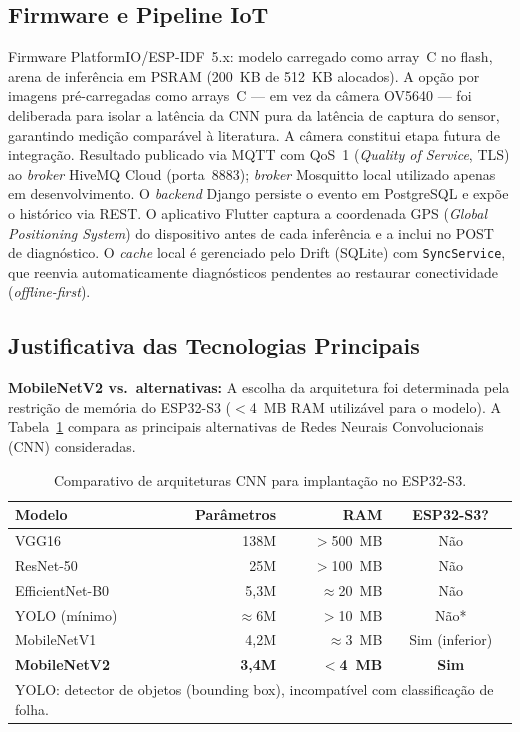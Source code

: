 \documentclass[12pt]{article}
\begin{document}
\subsection{Firmware e Pipeline IoT}

Firmware PlatformIO/ESP-IDF~5.x: modelo carregado como array~C no flash, arena de
inferência em PSRAM (200~KB de 512~KB alocados). A opção por imagens pré-carregadas
como arrays~C --- em vez da câmera OV5640 --- foi deliberada para isolar a latência
da CNN pura da latência de captura do sensor, garantindo medição comparável à
literatura. A câmera constitui etapa futura de integração. Resultado publicado via
MQTT com QoS~1 (\textit{Quality of Service}, TLS) ao \textit{broker} HiveMQ Cloud
(porta~8883); \textit{broker} Mosquitto local utilizado apenas em desenvolvimento.
O \textit{backend} Django persiste o evento em PostgreSQL e expõe o histórico via
REST. O aplicativo Flutter captura a coordenada GPS (\textit{Global Positioning
System}) do dispositivo antes de cada inferência e a inclui no POST de diagnóstico.
O \textit{cache} local é gerenciado pelo Drift (SQLite) com \texttt{SyncService}, que
reenvia automaticamente diagnósticos pendentes ao restaurar conectividade
(\textit{offline-first}).

\subsection{Justificativa das Tecnologias Principais}

\textbf{MobileNetV2 vs.\ alternativas:} A escolha da arquitetura foi determinada
pela restrição de memória do ESP32-S3 ($<$4~MB RAM utilizável para o modelo).
A Tabela~\ref{tab:modelos} compara as principais alternativas de Redes Neurais
Convolucionais (CNN) consideradas.

\begin{table}[ht]
\centering
\caption{Comparativo de arquiteturas CNN para implantação no ESP32-S3.}
\label{tab:modelos}
\begin{tabular}{@{}lrrc@{}}
\toprule
\textbf{Modelo} & \textbf{Parâmetros} & \textbf{RAM} & \textbf{ESP32-S3?} \\
\midrule
VGG16          & 138M  & $>$500~MB & Não \\
ResNet-50      & 25M   & $>$100~MB & Não \\
EfficientNet-B0 & 5,3M & $\approx$20~MB & Não \\
YOLO (mínimo)  & $\approx$6M & $>$10~MB & Não* \\
MobileNetV1    & 4,2M  & $\approx$3~MB & Sim (inferior) \\
\textbf{MobileNetV2} & \textbf{3,4M} & \textbf{$<$4~MB} & \textbf{Sim} \\
\bottomrule
\multicolumn{4}{l}{\footnotesize *YOLO: detector de objetos (bounding box), incompatível com classificação de folha.}
\end{tabular}
\end{table}
\end{document}
